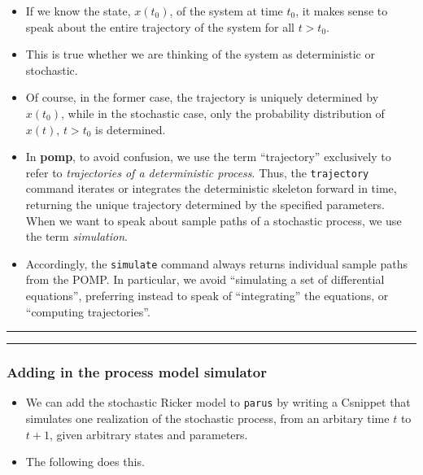 \documentclass[]{article}
\begin{document}
\begin{itemize}
\item
  If we know the state, \(x(t_0)\), of the system at time \(t_0\), it
  makes sense to speak about the entire trajectory of the system for all
  \(t>t_0\).
\item
  This is true whether we are thinking of the system as deterministic or
  stochastic.
\item
  Of course, in the former case, the trajectory is uniquely determined
  by \(x(t_0)\), while in the stochastic case, only the probability
  distribution of \(x(t)\), \(t>t_0\) is determined.
\item
  In \textbf{pomp}, to avoid confusion, we use the term ``trajectory''
  exclusively to refer to \emph{trajectories of a deterministic
  process}. Thus, the \texttt{trajectory} command iterates or integrates
  the deterministic skeleton forward in time, returning the unique
  trajectory determined by the specified parameters. When we want to
  speak about sample paths of a stochastic process, we use the term
  \emph{simulation}.
\item
  Accordingly, the \texttt{simulate} command always returns individual
  sample paths from the POMP. In particular, we avoid ``simulating a set
  of differential equations'', preferring instead to speak of
  ``integrating'' the equations, or ``computing trajectories''.
\end{itemize}

\begin{center}\rule{0.5\linewidth}{\linethickness}\end{center}

\begin{center}\rule{0.5\linewidth}{\linethickness}\end{center}

\subsubsection{Adding in the process model
simulator}\label{adding-in-the-process-model-simulator}

\begin{itemize}
\item
  We can add the stochastic Ricker model to \texttt{parus} by writing a
  Csnippet that simulates one realization of the stochastic process,
  from an arbitary time \(t\) to \(t+1\), given arbitrary states and
  parameters.
\item
  The following does this.
\end{itemize}
\end{document}
